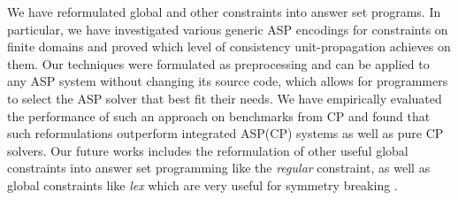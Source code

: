 \documentclass[letterpaper]{article}
\begin{document}
We have reformulated global and other constraints into answer set programs. In particular, we have investigated various generic ASP encodings for constraints on finite domains and proved which level of consistency unit-pro\-pa\-ga\-tion achieves on them.
Our techniques were formulated as preprocessing and can be applied to any ASP system without changing its source code, which allows for programmers to select the ASP solver that best fit their needs. We have empirically evaluated the performance of
such an approach on benchmarks from CP and found that such reformulations outperform integrated ASP(CP) systems as well as pure CP solvers.
Our future works includes the reformulation of other useful
global constraints into answer set programming like the
\emph{regular} constraint, as well as global constraints
like \emph{lex} which are very useful for symmetry breaking .
\end{document}

